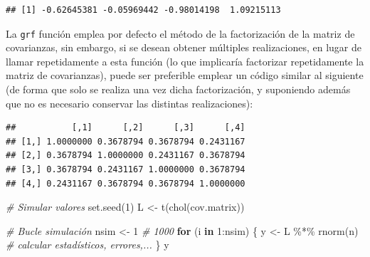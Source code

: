 \documentclass[
]{book}
\newenvironment{Shaded}{\begin{snugshade}}{\end{snugshade}}
\newcommand{\AttributeTok}[1]{\textcolor[rgb]{0.77,0.63,0.00}{#1}}
\newcommand{\CommentTok}[1]{\textcolor[rgb]{0.56,0.35,0.01}{\textit{#1}}}
\newcommand{\ControlFlowTok}[1]{\textcolor[rgb]{0.13,0.29,0.53}{\textbf{#1}}}
\newcommand{\DecValTok}[1]{\textcolor[rgb]{0.00,0.00,0.81}{#1}}
\newcommand{\FunctionTok}[1]{\textcolor[rgb]{0.00,0.00,0.00}{#1}}
\newcommand{\NormalTok}[1]{#1}
\newcommand{\OtherTok}[1]{\textcolor[rgb]{0.56,0.35,0.01}{#1}}
\newcommand{\SpecialCharTok}[1]{\textcolor[rgb]{0.00,0.00,0.00}{#1}}
\theoremstyle{break}
\theoremstyle{definition}
\theoremstyle{definition}
\theoremstyle{definition}
\theoremstyle{definition}
\theoremstyle{remark}
\begin{document}
\begin{verbatim}
## [1] -0.62645381 -0.05969442 -0.98014198  1.09215113
\end{verbatim}

La \texttt{grf} función emplea por defecto el método de la factorización de la matriz de covarianzas,
sin embargo, si se desean obtener múltiples realizaciones, en lugar de llamar repetidamente a esta función (lo que implicaría factorizar repetidamente la matriz de covarianzas),
puede ser preferible emplear un código similar al siguiente (de forma que solo se realiza una vez dicha factorización, y suponiendo además que no es necesario conservar las distintas realizaciones):

\begin{Shaded}
\end{Shaded}

\begin{verbatim}
##           [,1]      [,2]      [,3]      [,4]
## [1,] 1.0000000 0.3678794 0.3678794 0.2431167
## [2,] 0.3678794 1.0000000 0.2431167 0.3678794
## [3,] 0.3678794 0.2431167 1.0000000 0.3678794
## [4,] 0.2431167 0.3678794 0.3678794 1.0000000
\end{verbatim}

\begin{Shaded}
\begin{Highlighting}[]
\CommentTok{\# Simular valores}
\FunctionTok{set.seed}\NormalTok{(}\DecValTok{1}\NormalTok{)}
\NormalTok{L }\OtherTok{\textless{}{-}} \FunctionTok{t}\NormalTok{(}\FunctionTok{chol}\NormalTok{(cov.matrix))}

\CommentTok{\# Bucle simulación}
\NormalTok{nsim }\OtherTok{\textless{}{-}} \DecValTok{1} \CommentTok{\# 1000}
\ControlFlowTok{for}\NormalTok{ (i }\ControlFlowTok{in} \DecValTok{1}\SpecialCharTok{:}\NormalTok{nsim) \{}
\NormalTok{  y }\OtherTok{\textless{}{-}}\NormalTok{ L }\SpecialCharTok{\%*\%} \FunctionTok{rnorm}\NormalTok{(n)}
  \CommentTok{\# calcular estadísticos, errores,...}
\NormalTok{\}}
\NormalTok{y}
\end{Highlighting}
\end{Shaded}
\end{document}
